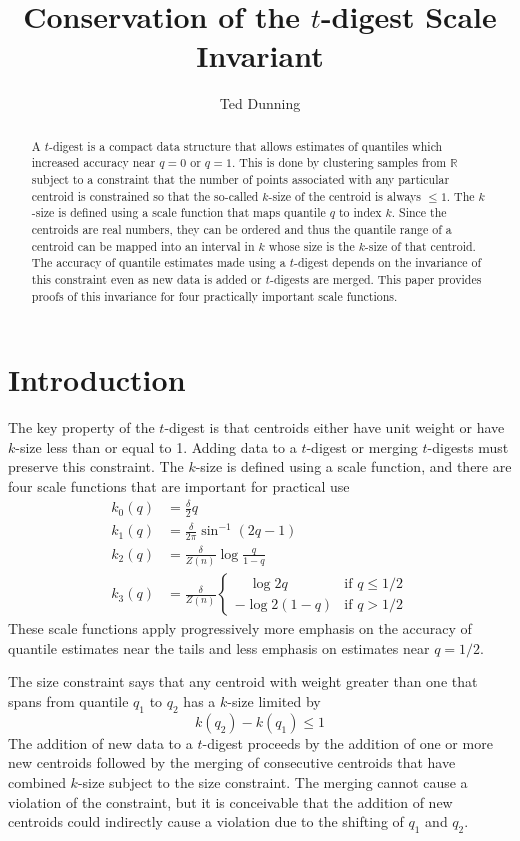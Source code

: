\documentclass[11pt]{amsart}
\title{Conservation of the $t$-digest Scale Invariant}
\author{Ted Dunning}
\date{}                                           %
\begin{document}
\begin{abstract}
A $t$-digest is a compact data structure that allows estimates of quantiles which increased accuracy near $q = 0$ or $q=1$. This is done by clustering samples from $\mathbb R$ subject to a constraint that the number of points associated with any particular centroid is constrained so that the so-called $k$-size of the centroid is always $\le 1$. The $k$-size is defined using a scale function that maps quantile $q$ to index $k$. Since the centroids are real numbers, they can be ordered and thus the quantile range of a centroid can be mapped into an interval in $k$ whose size is the $k$-size of that centroid. The accuracy of quantile estimates made using a $t$-digest  depends on the invariance of this constraint even as new data is added or $t$-digests are merged. This paper provides proofs of this invariance for four practically important scale functions.
\end{abstract}
\maketitle
\section{Introduction}
The key property of the $t$-digest   \citep{t-digest-arxiv} is that centroids either have unit weight or have $k$-size less than or equal to 1. Adding data to a $t$-digest or merging $t$-digests must preserve this constraint. The $k$-size is defined using a scale function, and there are  four scale functions that are important for practical use 
\[
\begin{aligned}
k_0(q) &= \frac \delta 2 q \\
k_1(q) &= \frac \delta {2\pi}  \sin^{-1}(2q-1)   \\
k_2(q) &= \frac \delta {Z(n)} \log {\frac q {1-q}} \\
k_3(q) &= \frac \delta {Z(n)}\begin{cases}
\quad \log 2q & \text{if  } q \le 1/2 \\
- \log 2(1-q) & \text{if  } q > 1/2
\end{cases}
\end{aligned}
\]
These scale functions apply progressively more emphasis on the accuracy of quantile estimates near the tails and less emphasis on estimates near $q=1/2$. 
 
The size constraint says that any centroid with weight greater than one that spans from quantile $q_1$ to $q_2$ has a $k$-size  limited by
\[
k(q_2) - k(q_1) \le 1
\]
The addition of new data to a $t$-digest proceeds by the addition of one or more new centroids followed by the merging of consecutive centroids that have combined $k$-size subject to the size constraint. The merging cannot cause a violation of the constraint, but it is conceivable that the addition of new centroids could indirectly cause a violation due to the shifting of $q_1$ and $q_2$.
\end{document}

